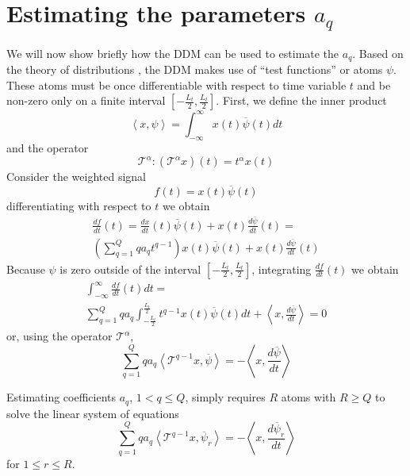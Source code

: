 \documentclass[twoside,a4paper]{article}
\begin{document}
\section{Estimating the parameters \lowercase{$a_{q}$}}
\label{sec:estimating_aj}
We will now show briefly how the DDM can be used to estimate the $a_{q}$. Based on
the theory of distributions \cite{schwartz1959theorie}, the DDM
makes use of ``test
functions'' or atoms $\psi$. These atoms must be once differentiable with
respect to time variable $t$ and be non-zero only on a finite interval
$[-\frac{L_{t}}{2},\frac{L_{t}}{2}]$. First, we define the inner product
%
\begin{equation}
    \label{eq:ddm:inner:prod:def}
    \left\langle x , \psi \right\rangle = 
    \int_{-\infty}^{\infty}x(t)\overline{\psi}(t)dt
\end{equation}
%
and the operator 
%
\begin{equation}
\mathcal{T}^{\alpha} : (\mathcal{T}^{\alpha}x)(t) = t^{\alpha}x(t)
\end{equation}
%
Consider the weighted signal
%
\begin{equation}
    f(t) = x(t) \overline{\psi}(t)
\end{equation}
%
differentiating with respect to $t$ we obtain
%
\begin{multline}
    \label{eq:ddm:weighted:sig:derivative}
    \frac{df}{dt}(t) = 
    \frac{dx}{dt}(t)\overline{\psi}(t)
    + x(t)\frac{d\overline{\psi}}{dt}(t) = \\
    \left( \sum_{q=1}^{Q} q a_{q} t^{q-1} \right) x(t)\overline{\psi}(t)
    + x(t)\frac{d\overline{\psi}}{dt}(t)
\end{multline}
%
Because $\psi$ is zero outside of the interval $[-\frac{L_{t}}{2},\frac{L_{t}}{2}]$, integrating
$\frac{df}{dt}(t)$ we obtain
%
\begin{multline}
    \int_{-\infty}^{\infty}\frac{df}{dt}(t)dt = \\
    \sum_{q=1}^{Q} q a_{q} \int_{-\frac{L_{t}}{2}}^{\frac{L_{t}}{2}} t^{q-1} x(t) \overline{\psi}(t) dt
    + \left\langle x, \frac{d\overline{\psi}}{dt} \right\rangle = 0
\end{multline}
%
or, using the operator $\mathcal{T}^{\alpha}$,
%
\begin{equation} 
    \sum_{q=1}^{Q} q a_{q} 
    \left\langle \mathcal{T}^{q-1} x , \overline{\psi} \right\rangle
    = -\left\langle x, \frac{d\overline{\psi}}{dt} \right\rangle
\end{equation}
%

Estimating coefficients $a_{q}$, ${1 < q \leq Q}$,
simply requires $R$ atoms with $R \geq Q$ to solve the linear system of
equations
\begin{equation}
    \label{eq:ddmsyseq}
    \sum_{q=1}^{Q} q a_{q} 
    \left\langle \mathcal{T}^{q-1} x , \overline{\psi}_{r} \right\rangle
    = -\left\langle x, \frac{d\overline{\psi}_{r}}{dt} \right\rangle
\end{equation}
for $1 \leq r \leq R$.
\end{document}

